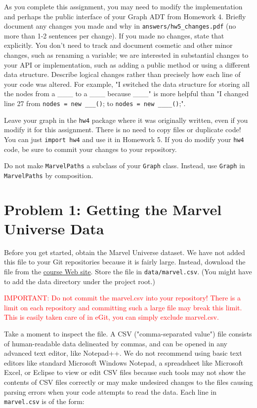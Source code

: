 \documentclass[11pt]{article}
\begin{document}
\noindent As you complete this assignment, you may need to modify the implementation and perhaps the public interface of your Graph ADT from Homework 4. Briefly document any changes you made and why in \texttt{answers/hw5\_changes.pdf} (no more than 1-2 sentences per change). If you made no changes, state that explicitly. You don't need to track and document cosmetic and other minor changes, such as renaming a variable; we are interested in substantial changes to your API or implementation, such as adding a public method or using a different data structure. Describe logical changes rather than precisely how each line of your code was altered. For example, "I switched the data structure for storing all the nodes from a \_\_\_ to a \_\_\_ because \_\_\_" is more helpful than "I changed line 27 from \texttt{nodes = new \_\_\_()}; to \texttt{nodes = new \_\_\_\_()};".

\noindent Leave your graph in the \texttt{hw4} package where it was originally written, even if you modify it for this assignment. There is no need to copy files or duplicate code! You can just \texttt{import hw4} and use it in Homework 5. If you do modify your \texttt{hw4} code, be sure to commit your changes to your repository.

Do not make \texttt{MarvelPaths} a subclass of your \texttt{Graph} class. Instead, use \texttt{Graph} in \texttt{MarvelPaths} by composition.
\newpage

\section*{Problem 1: Getting the Marvel Universe Data}
\label{sec:Problem 1}

\noindent Before you get started, obtain the Marvel Universe dataset. We have not added this file to your Git repositories because it is fairly large. Instead, download the file from the \href{https://www.cs.rpi.edu/academics/courses/spring23/csci2600/Documents/marvel.csv}{course Web site}. Store the file in \texttt{data/marvel.csv}. (You might have to add the data directory under the project root.)

\noindent \textcolor{red}{IMPORTANT: Do not commit the marvel.csv into your repository! There is a limit on each repository and committing such a large file may break this limit. This is easily taken care of in eGit, you can simply exclude marvel.csv.}

\noindent Take a moment to inspect the file. A CSV ("comma-separated value") file consists of human-readable data delineated by commas, and can be opened in any advanced text editor, like Notepad++. We do not recommend using basic text editors like standard Microsoft Windows Notepad, a spreadsheet like Microsoft Excel, or Eclipse to view or edit CSV files because such tools may not show the contents of CSV files correctly or may make undesired changes to the files causing parsing errors when your code attempts to read the data. Each line in \texttt{marvel.csv} is of the form:
\end{document}
